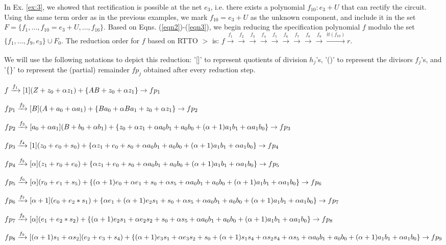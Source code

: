 \begin{Example}
In Ex. \ref{ex:3}, we showed that rectification is possible at the net
$e_3$, i.e. there exists a polynomial $f_{10}: e_3 + U$ that can
rectify the circuit. Using the same term order as in the previous
examples, we mark $f_{10} = e_3 + U$ as the unknown component, and
include it in the set $F=\{f_1,\dots,f_{10} = e_3+U,\dots,f_{16}\}$. Based
on Eqns. (\ref{eqn2})-(\ref{eqn3}), we begin reducing the
specification polynomial $f$ modulo the set $\{f_1,\dots,f_9,e_3\}
\cup F_0$. The reduction order for $f$ based on RTTO $>$ is: 
$f\xrightarrow[]{f_{1}}\xrightarrow[]{f_2}\xrightarrow[]{f_3}\xrightarrow[]{f_4}\xrightarrow[]{f_5}\xrightarrow[]{f_6}\xrightarrow[]{f_7}\xrightarrow[]{f_8}\xrightarrow[]{f_9}\xrightarrow[]{lt(f_{10})}r$.

We will use the following notations to depict this reduction: '[]' to
represent quotients of division $h_j$'s, '()' to represent the
divisors $f_j$'s, and '\{\}' to represent the (partial) remainder
$fp_j$ obtained after every reduction step.

\begin{small}
$f\xrightarrow[]{f_{1}}[1](Z + z_0 +\alpha z_1)+\{ AB+z_0+\alpha z_1\}\rightarrow fp_1$

$fp_1\xrightarrow[]{f_2}[B](A+a_0+\alpha a_1)+\{Ba_0+\alpha Ba_1+z_0+\alpha z_1\}\rightarrow fp_2$

$fp_2\xrightarrow[]{f_3}[a_0+\alpha a_1](B+b_0+\alpha b_1)+\{z_0+\alpha z_1+\alpha a_0b_1+a_0b_0+ (\alpha+1)a_1b_1 + \alpha a_1b_0\}\rightarrow fp_3$

$fp_3\xrightarrow[]{f_4}[1](z_0+e_0+s_0)+\{\alpha z_1+e_0+s_0+\alpha a_0b_1+a_0b_0+(\alpha+1)a_1b_1+\alpha a_1b_0\}\rightarrow fp_4$

$fp_4\xrightarrow[]{f_5}[\alpha](z_1+r_0+e_0)+\{\alpha z_1+e_0+s_0+\alpha a_0b_1+a_0b_0+(\alpha+1)a_1b_1+\alpha a_1b_0\}\rightarrow fp_5$

$fp_5\xrightarrow[]{f_6}[\alpha](r_0+e_1+s_5)+\{(\alpha+1)e_0+\alpha e_1+s_0+\alpha s_5+\alpha a_0b_1+a_0b_0+(\alpha+1)a_1b_1+\alpha a_1b_0\}\rightarrow fp_6$

$fp_6\xrightarrow[]{f_7}[\alpha+1](e_0+e_2*s_1)+\{\alpha e_1+(\alpha+1)e_2s_1+s_0+\alpha s_5+\alpha a_0b_1+a_0b_0+(\alpha+1)a_1b_1+\alpha a_1b_0\}\rightarrow fp_7$

$fp_7\xrightarrow[]{f_8}[\alpha](e_1+e_2*s_2)+\{(\alpha+1)e_2s_1+\alpha e_2s_2 + s_0+\alpha s_5+\alpha a_0b_1+a_0b_0+(\alpha+1)a_1b_1+\alpha a_1b_0\}\rightarrow fp_8$

$fp_8\xrightarrow[]{f_9}[(\alpha+1)s_1 + \alpha s_2](e_2+e_3+s_4)+\{(\alpha+1)e_3s_1+ \alpha e_3s_2 +s_0+(\alpha+1)s_1s_4+\alpha s_2s_4+\alpha s_5+\alpha a_0b_1+a_0b_0+(\alpha+1)a_1b_1+\alpha a_1b_0\}\rightarrow fp_9$
\end{small}


\end{Example}

